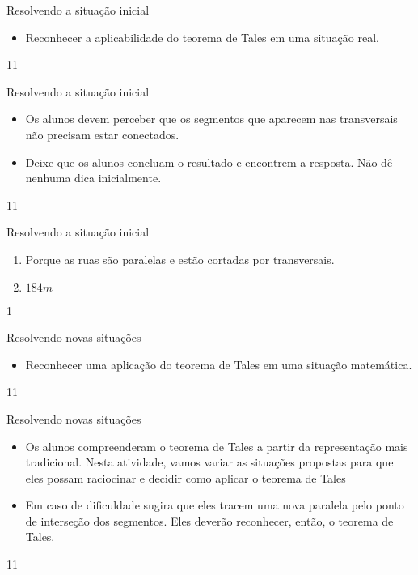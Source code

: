 \clearpage
\def\currentcolor{session2}
\begin{objectives}{Resolvendo a situação inicial}
{
\begin{itemize}
\item {} 
Reconhecer a aplicabilidade do teorema de Tales em uma situação real.

\end{itemize}
}{1}{1}
\end{objectives}
\begin{sugestions}{Resolvendo a situação inicial}
{
\begin{itemize}
\item {} 
Os alunos devem perceber que os segmentos que aparecem nas transversais não precisam estar conectados.

\item {} 
Deixe que os alunos concluam o resultado e encontrem a resposta. Não dê nenhuma dica inicialmente.

\end{itemize}
}{1}{1}
\end{sugestions}
\begin{answer}{Resolvendo a situação inicial}
{
\begin{enumerate}
\item {} 
Porque as ruas são paralelas e estão cortadas por transversais.

\item {} 
\(184m\)

\end{enumerate}
}{1}
\end{answer}
\begin{objectives}{Resolvendo novas situações}
{
\begin{itemize}
\item {} 
Reconhecer uma aplicação do teorema de Tales em uma situação matemática.

\end{itemize}
}{1}{1}
\end{objectives}
\begin{sugestions}{Resolvendo novas situações}
{
\begin{itemize}
\item {} 
Os alunos compreenderam o teorema de Tales a partir da representação mais tradicional. Nesta atividade, vamos variar as situações propostas para que eles possam raciocinar e decidir como aplicar o teorema de Tales

\item {} 
Em caso de dificuldade sugira que eles tracem uma nova paralela pelo ponto de interseção dos segmentos. Eles deverão reconhecer, então, o teorema de Tales.

\end{itemize}
}{1}{1}
\end{sugestions}
